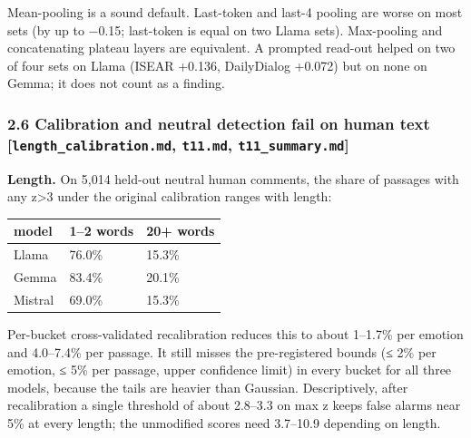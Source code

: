 \documentclass[
  10pt,
]{article}
\newcounter{none} %
\begin{document}
Mean-pooling is a sound default. Last-token and last-4 pooling are worse
on most sets (by up to −0.15; last-token is equal on two Llama sets).
Max-pooling and concatenating plateau layers are equivalent. A prompted
read-out helped on two of four sets on Llama (ISEAR +0.136, DailyDialog
+0.072) but on none on Gemma; it does not count as a finding.

\subsubsection{\texorpdfstring{2.6 Calibration and neutral detection
fail on human text {[}\texttt{length\_calibration.md}, \texttt{t11.md},
\texttt{t11\_summary.md}{]}}{2.6 Calibration and neutral detection fail on human text {[}length\_calibration.md, t11.md, t11\_summary.md{]}}}\label{26-calibration-and-neutral-detection-fail-on-human-text-length_calibrationmd-t11md-t11_summarymd}

\textbf{Length.} On 5,014 held-out neutral human comments, the share of
passages with any \textbar z\textbar\textgreater3 under the original
calibration ranges with length:

{\def\LTcaptype{none} %
\begin{longtable}[]{@{}lll@{}}
\toprule\noalign{}
model & 1--2 words & 20+ words \\
\midrule\noalign{}
\endhead
\bottomrule\noalign{}
\endlastfoot
Llama & 76.0\% & 15.3\% \\
Gemma & 83.4\% & 20.1\% \\
Mistral & 69.0\% & 15.3\% \\
\end{longtable}
}

Per-bucket cross-validated recalibration reduces this to about 1--1.7\%
per emotion and 4.0--7.4\% per passage. It still misses the
pre-registered bounds (≤ 2\% per emotion, ≤ 5\% per passage, upper
confidence limit) in every bucket for all three models, because the
tails are heavier than Gaussian. Descriptively, after recalibration a
single threshold of about 2.8--3.3 on max \textbar z\textbar{} keeps
false alarms near 5\% at every length; the unmodified scores need
3.7--10.9 depending on length.
\end{document}
